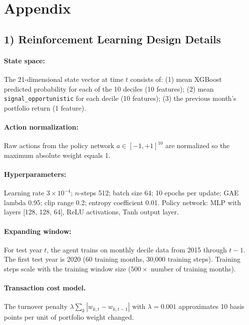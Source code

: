 \documentclass{article}
\begin{document}
\newpage
\appendix
\section*{Appendix}
\subsection*{1) Reinforcement Learning Design Details}
\paragraph{State space:} The 21-dimensional state vector at time $t$ consists of: (1) mean XGBoost predicted probability for each of the 10 deciles (10 features); (2) mean \texttt{signal\_opportunistic} for each decile (10 features); (3) the previous month's portfolio return (1 feature).

\paragraph{Action normalization:} Raw actions from the policy network $a \in [-1,+1]^{10}$ are normalized so the maximum absolute weight equals 1.

\paragraph{Hyperparameters:} Learning rate $3 \times 10^{-4}$; $n$-steps 512; batch size 64; 10 epochs per update; GAE lambda 0.95; clip range 0.2; entropy coefficient 0.01. Policy network: MLP with layers [128, 128, 64], ReLU activations, Tanh output layer.

\paragraph{Expanding window:} For test year $t$, the agent trains on monthly decile data from 2015 through $t-1$. The first test year is 2020 (60 training months, 30,000 training steps). Training steps scale with the training window size ($500 \times$ number of training months).

\paragraph{Transaction cost model.} The turnover penalty $\lambda \sum_k |w_{k,t} - w_{k,t-1}|$ with $\lambda = 0.001$ approximates 10 basis points per unit of portfolio weight changed.
\end{document}
